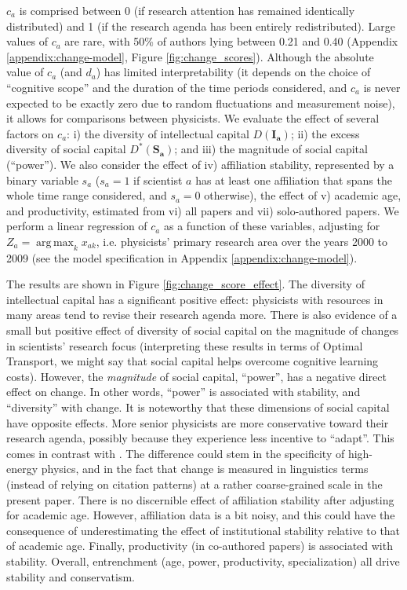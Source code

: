 \documentclass{article}
\DeclareMathOperator*{\argmax}{arg\,max}
\begin{document}
$c_a$ is comprised between 0 (if research attention has remained identically distributed) and 1 (if the research agenda has been entirely redistributed).
Large values of $c_a$ are rare, with 50\% of authors lying between 0.21 and 0.40  (Appendix \ref{appendix:change-model}, Figure \ref{fig:change_scores}). Although the absolute value of $c_a$ (and $d_a$) has limited interpretability (it depends on the choice of ``cognitive scope''   and the duration of the time periods considered, and $c_a$ is never expected to be exactly zero due to random fluctuations and measurement noise), it allows for comparisons between physicists. We evaluate the effect of several factors on $c_a$: i) the diversity of intellectual capital $D(\bm{I_a})$; ii) the excess diversity of social capital $D^{\ast}(\bm{S_a})$; and iii) the magnitude of social capital (``power''). We also consider the effect of iv) affiliation stability, represented by a binary variable $s_a$ ($s_a=1$ if scientist $a$ has at least one affiliation that spans the whole time range considered, and $s_a=0$ otherwise), the effect of v) academic age, and productivity, estimated from vi) all papers and vii) solo-authored papers. We perform a linear regression of $c_a$ as a function of these variables, adjusting for $Z_a=\argmax_{k} x_{ak}$, i.e. physicists' primary research area over the years 2000 to 2009 (see the model specification in Appendix \ref{appendix:change-model}).

The results are shown in Figure \ref{fig:change_score_effect}. The diversity of intellectual capital has a significant positive effect: physicists with resources in many areas tend to revise their research agenda more. There is also evidence of a small but positive effect of diversity of social capital on the magnitude of changes in scientists' research focus (interpreting these results in terms of Optimal Transport, we might say that social capital helps overcome cognitive learning costs). However, the \textit{magnitude} of social capital, ``power'', has a negative direct effect on change. In other words, ``power'' is associated with stability, and ``diversity'' with change. It is noteworthy that these dimensions of social capital have opposite effects. More senior physicists are more conservative toward their research agenda, possibly because they experience less incentive to ``adapt''. This comes in contrast with \cite{Zeng2019}. The difference could stem in the specificity of high-energy physics, and in the fact that change is measured in linguistics terms (instead of relying on citation patterns) at a rather coarse-grained scale in the present paper. There is no discernible effect of affiliation stability after adjusting for academic age. However, affiliation data is a bit noisy, and this could have the consequence of underestimating the effect of institutional stability relative to that of academic age. Finally, productivity (in co-authored papers) is associated with stability. Overall, entrenchment (age, power, productivity, specialization) all drive stability and conservatism. 
\end{document}
